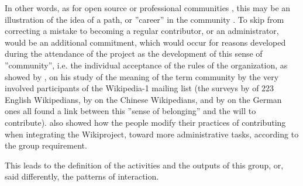 In other words, as for open source \citep{LakhaniWolf05,Shah06,Scacchi07}
or professional communities \citep{JullienRoudautleSquin11}, this
may be an illustration of the idea of a path, or ''career'' in the
community \citep[in the sens given by][]{Becker60,Becker63}. To skip
from correcting a mistake to becoming a regular contributor, or an
administrator, would be an additional commitment, which would occur
for reasons developed during the attendance of the project as the
development of this sense of ''community'', i.e. the individual
acceptance of the rules of the organization, as showed by \citet{Pentzold10},
on his study of the meaning of the term community by the very involved
participants of the Wikipedia-1 mailing list (the surveys by \citet{ChoChenChung10}
of 223 English Wikipedians, by \citet{Hoetal11} on the Chinese Wikipedians,
and by \citet{SchroerHertel09} on the German ones all found a link
between this ''sense of belonging'' and the will to contribute).
\citet{KitturPendletonKraut09} also showed how the people modify
their practices of contributing when integrating the Wikiproject,
toward more administrative tasks, according to the group requirement.

This leads to the definition of the activities and the outputs of
this group, or, said differently, the patterns of interaction.